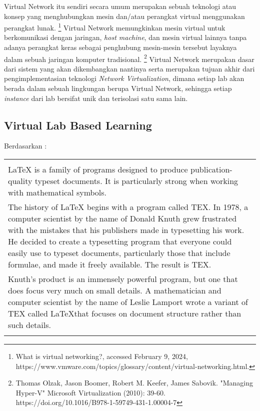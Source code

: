 Virtual Network itu sendiri secara umum merupakan sebuah teknologi atau konsep yang menghubungkan mesin dan/atau perangkat virtual 
menggunakan perangkat lunak. 
\footnote{What is virtual networking?, accessed February 9, 2024, https://www.vmware.com/topics/glossary/content/virtual-networking.html.} 
Virtual Network memungkinkan mesin virtual untuk berkomunikasi dengan jaringan, \textit{host machine}, dan mesin virtual 
lainnya tanpa adanya perangkat keras sebagai penghubung mesin-mesin tersebut layaknya dalam sebuah jaringan komputer tradisional. 
\footnote{Thomas Olzak, Jason Boomer, Robert M. Keefer, James Sabovik. "Managing Hyper-V" Microsoft Virtualization (2010): 39-60. https://doi.org/10.1016/B978-1-59749-431-1.00004-7} 
Virtual Network merupakan dasar dari sistem yang akan dikembangkan nantinya serta merupakan tujuan akhir dari pengimplementasian teknologi \textit{Network Virtualization},
dimana setiap lab akan berada dalam sebuah lingkungan berupa Virtual Network, sehingga setiap \textit{instance} dari lab bersifat unik dan terisolasi satu sama lain.
\par
\subsection{Virtual Lab Based Learning}
\label{sec:latexBrief}
Berdasarkan \cite{latex:intro}: \\
\begin{tabular}{| p{13cm} |}
	\hline
	\\
	LaTeX is a family of programs designed to produce publication-quality typeset documents.
	It is particularly strong when working with mathematical symbols. \\
	The history of LaTeX begins with a program called TEX.
	In 1978, a computer scientist by the name of Donald Knuth grew frustrated with the mistakes that his publishers made in typesetting his work.
	He decided to create a typesetting program that everyone could easily use to typeset documents, particularly those that include formulae, and made it freely available.
	The result is TEX. \\
	Knuth's product is an immensely powerful program, but one that does focus very much on small details.
	A mathematician and computer scientist by the name of Leslie Lamport wrote a variant of TEX called \LaTeX that focuses on document structure rather than such details. \\
	\\
	\hline
\end{tabular}

